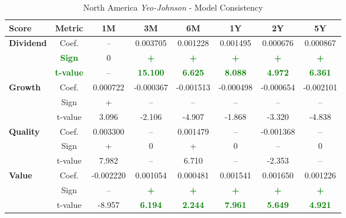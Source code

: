 \documentclass[11pt,english,a4paper,hidelinks]{book}
\begin{document}
\begin{table}[H]
    \centering
    \caption{North America \textit{Yeo-Johnson} - Model Consistency}
    \begin{tabular}{lccccccc}
        \toprule
        \textbf{Score} & \textbf{Metric} & \textbf{1M} & \textbf{3M} & \textbf{6M} & \textbf{1Y} & \textbf{2Y} & \textbf{5Y} \\
        \midrule
        \multirow{3}{*}{\textbf{Dividend}}
            & Coef.   & -- & 0.003705 & 0.001228 & 0.001495 & 0.000676 & 0.000867 \\
            & \textbf{\textcolor{green}{Sign}}    & 0 & \textbf{\textcolor{green}{+}} & \textbf{\textcolor{green}{+}} & \textbf{\textcolor{green}{+}} & \textbf{\textcolor{green}{+}} & \textbf{\textcolor{green}{+}} \\
            & \textbf{\textcolor{green}{t-value}} & -- & \textbf{\textcolor{green}{15.100}} & \textbf{\textcolor{green}{6.625}} & \textbf{\textcolor{green}{8.088}} & \textbf{\textcolor{green}{4.972}} & \textbf{\textcolor{green}{6.361}} \\
        \cmidrule{1-8}
        \multirow{3}{*}{\textbf{Growth}}
            & Coef.   & 0.000722 & -0.000367 & -0.001513 & -0.000498 & -0.000654 & -0.002101 \\
            & Sign    & + & – & – & – & – & – \\
            & t-value & 3.096 & -2.106 & -4.907 & -1.868 & -3.320 & -4.838 \\
        \cmidrule{1-8}
        \multirow{3}{*}{\textbf{Quality}}
            & Coef.   & 0.003300 & -- & 0.001479 & -- & -0.001368 & -- \\
            & Sign    & + & 0 & + & 0 & – & 0 \\
            & t-value & 7.982 & -- & 6.710 & -- & -2.353 & -- \\
        \cmidrule{1-8}
        \multirow{3}{*}{\textbf{Value}}
            & Coef.   & -0.002220 & 0.001054 & 0.000481 & 0.001541 & 0.001650 & 0.001226 \\
            & Sign    & – & \textbf{\textcolor{green}{+}} & \textbf{\textcolor{green}{+}} & \textbf{\textcolor{green}{+}} & \textbf{\textcolor{green}{+}} & \textbf{\textcolor{green}{+}} \\
            & t-value & -8.957 & \textbf{\textcolor{green}{6.194}} & \textbf{\textcolor{green}{2.244}} & \textbf{\textcolor{green}{7.961}} & \textbf{\textcolor{green}{5.649}} & \textbf{\textcolor{green}{4.921}} \\
        \bottomrule
    \end{tabular}
    \label{tab:usa_gaussian_model_consistency}
\end{table}
\end{document}
